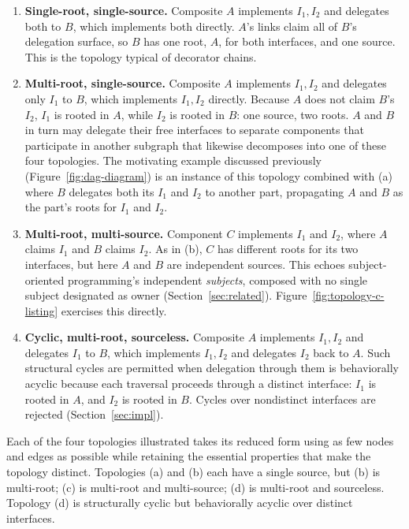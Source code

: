 \documentclass[acmsmall,screen,review,anonymous]{acmart}
\theoremstyle{acmplain}
\begin{document}
\begin{enumerate}
\item[(a)] \textbf{Single-root, single-source.}
Composite $A$ implements $I_1, I_2$ and delegates both to $B$, which
implements both directly. $A$'s links claim all of $B$'s delegation surface,
so $B$ has one root, $A$, for both interfaces, and one source. This is the
topology typical of decorator chains.

\item[(b)] \textbf{Multi-root, single-source.}
Composite $A$ implements $I_1, I_2$ and delegates only $I_1$ to $B$,
which implements $I_1, I_2$ directly. Because $A$ does not claim $B$'s $I_2$,
$I_1$ is rooted in $A$, while $I_2$ is rooted in $B$: one source, two roots.
$A$ and $B$ in turn may delegate their free interfaces to separate components that
participate in another subgraph that likewise decomposes into one of
these four topologies. The motivating example discussed previously
(Figure~\ref{fig:dag-diagram}) is an instance of this topology combined with (a)
where $B$ delegates both its $I_1$ and $I_2$ to another part,
propagating $A$ and $B$ as the part's roots for $I_1$ and $I_2$.

\item[(c)] \textbf{Multi-root, multi-source.}
Component $C$ implements $I_1$ and $I_2$, where $A$ claims $I_1$ and
$B$ claims $I_2$. As in (b), $C$ has different roots for its two
interfaces, but here $A$ and $B$ are independent sources. This echoes
subject-oriented programming's independent \emph{subjects}, composed
with no single subject designated as owner (Section~\ref{sec:related}).
Figure~\ref{fig:topology-c-listing} exercises this directly.

\item[(d)] \textbf{Cyclic, multi-root, sourceless.}
Composite $A$ implements $I_1, I_2$ and delegates $I_1$ to $B$, which
implements $I_1, I_2$ and delegates $I_2$ back to $A$. Such structural cycles are
permitted when delegation through them is behaviorally acyclic
because each traversal proceeds through a distinct interface: $I_1$
is rooted in $A$, and $I_2$ is rooted in $B$. Cycles over nondistinct interfaces
are rejected (Section~\ref{sec:impl}).
\end{enumerate}

Each of the four topologies illustrated takes its reduced form using as few nodes and edges as possible while retaining
the essential properties that make the topology distinct. Topologies (a) and (b) each have a single source, but (b) is multi-root;
(c) is multi-root and multi-source; (d) is multi-root and sourceless. Topology (d) is structurally cyclic but behaviorally
acyclic over distinct interfaces.
\end{document}

